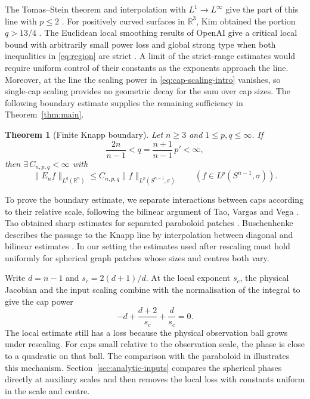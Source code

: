 \documentclass[11pt]{article}
\numberwithin{equation}{section}
\newtheorem{theorem}{Theorem}[section]
\newcommand{\R}{\mathbb{R}}
\newcommand{\norm}[1]{\lVert #1\rVert}
\begin{document}
The Tomas--Stein theorem and interpolation with \(L^1\to L^\infty\)
give the part of this line with \(p\leq2\) \cite{stein,tomas}.
For positively curved surfaces in \(\R^3\), Kim obtained the portion
\(q>13/4\) \cite[Theorem~1.2]{kim}. The Euclidean local smoothing
results of OpenAI give a critical local bound with arbitrarily small
power loss and global strong type when both inequalities in
\eqref{eq:region} are strict
\cite[Lemma~9.2 and Corollary~9.3]{openai-local-smoothing}.
A limit of the strict-range estimates would require uniform control of
their constants as the exponents approach the line. Moreover, at the
line the scaling power in \eqref{eq:cap-scaling-intro} vanishes, so
single-cap scaling provides no geometric decay for the sum over cap
sizes. The following boundary estimate supplies the remaining
sufficiency in Theorem~\ref{thm:main}.

\begin{theorem}[Finite Knapp boundary]\label{thm:boundary}
Let $n\geq3$ and $1\leq p,q\leq\infty$. If
\begin{equation}\label{eq:boundary}
 \frac{2n}{n-1}<q=\frac{n+1}{n-1}\,p'<\infty,
\end{equation}
then \(\exists\,C_{n,p,q}<\infty\) with
\[
 \norm{E_n f}_{L^q(\R^n)}\leq C_{n,p,q}\norm{f}_{L^p(S^{n-1},\sigma)}
 \qquad (f\in L^p(S^{n-1},\sigma)).
\]
\end{theorem}

To prove the boundary estimate, we separate interactions between caps
according to their relative scale, following the bilinear argument of
Tao, Vargas and Vega \cite{TVV}. Tao
obtained sharp estimates for separated paraboloid patches
\cite{tao-paraboloid}. Buschenhenke describes the passage to the
Knapp line by interpolation between diagonal and bilinear estimates
\cite[Section~1.1]{buschenhenke}. In our setting the estimates used
after rescaling must hold uniformly for spherical graph patches
whose sizes and centres both vary.

Write \(d=n-1\) and \(s_c=2(d+1)/d\). At the local exponent \(s_c\),
the physical Jacobian and the input scaling combine with the
normalisation of the integral to give the cap power
\[
 -d+\frac{d+2}{s_c}+\frac{d}{s_c}=0.
\]
The local estimate still has a loss because the physical observation
ball grows under rescaling. For caps small relative to the observation
scale, the phase is close to a quadratic on that ball. The comparison
with the paraboloid in \cite[Section~12]{openai-local-smoothing}
illustrates this mechanism. Section~\ref{sec:analytic-inputs} compares
the spherical phases directly at auxiliary scales and then removes the
local loss with constants uniform in the scale and centre.
\end{document}
